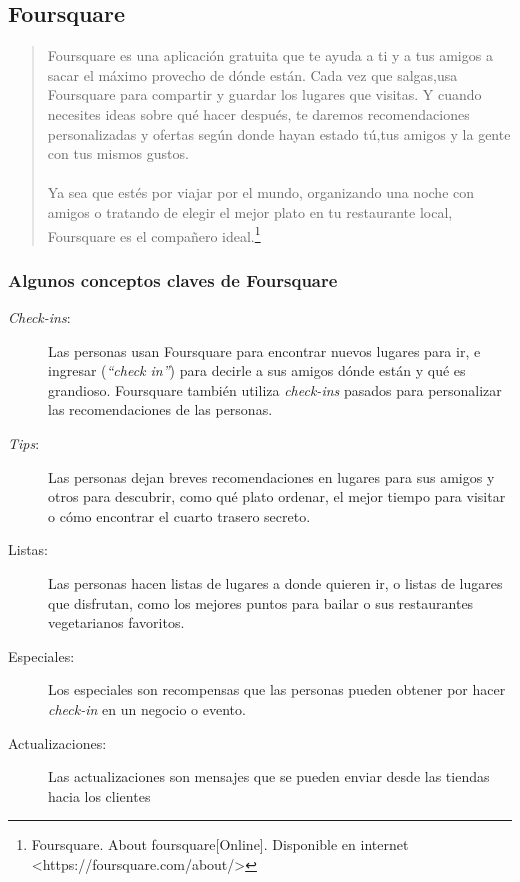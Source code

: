 \subsection{Foursquare}
\begin{quote}
Foursquare es una aplicaci\'on gratuita que te ayuda a ti y a tus amigos a sacar el m\'aximo provecho de d\'onde est\'an.​ Cada vez que salgas,​ usa Foursquare para compartir y guardar los lugares que visitas.​ Y cuando necesites ideas sobre qu\'e hacer despu\'es,​ te daremos recomendaciones personalizadas y ofertas seg\'un donde hayan estado t\'u,​ tus amigos y la gente con tus mismos gustos.​
\paragraph{}
Ya sea que est\'es por viajar por el mundo, organizando una noche con amigos o tratando de elegir el mejor plato en tu restaurante local, Foursquare es el compa\~nero ideal.\footnote{Foursquare. About foursquare[Online]. Disponible en internet \textless https://foursquare.com/about/\textgreater}
\end{quote}
\subsubsection{Algunos conceptos claves de Foursquare}
\begin{description}
\item[\textit{Check-ins}:] Las personas usan Foursquare para encontrar nuevos lugares para ir, e ingresar (\textit{“check in”}) para decirle a sus amigos d\'onde est\'an y qu\'e es grandioso. Foursquare tambi\'en utiliza \textit{check-ins} pasados para personalizar las recomendaciones de las personas.
\item[\textit{Tips}:] Las personas dejan breves recomendaciones en lugares para sus amigos y otros para descubrir, como qu\'e plato ordenar, el mejor tiempo para visitar o c\'omo encontrar el cuarto trasero secreto.
\item[Listas:] Las personas hacen listas de lugares a donde quieren ir, o listas de lugares que disfrutan, como los mejores puntos para bailar o sus restaurantes vegetarianos favoritos.
\item[Especiales:] Los especiales son recompensas que las personas pueden obtener por hacer \textit{check-in} en un negocio o evento.
\item[Actualizaciones:] Las actualizaciones son mensajes que se pueden enviar desde las tiendas hacia los clientes
\end{description}
